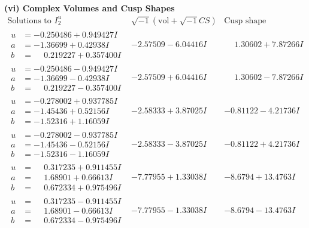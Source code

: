 \documentclass[1p]{elsarticle_modified}
\theoremstyle{definition}
\newcommand{\I}{\sqrt{-1}}
\begin{document}
\newpage\flushleft \textbf{(vi) Complex Volumes and Cusp Shapes}
$$\begin{array}{c|c|c}  
\text{Solutions to }I^u_{2}& \I (\text{vol} + \sqrt{-1}CS) & \text{Cusp shape}\\
 \hline 
\begin{aligned}
u &= -0.250486 + 0.949427 I \\
a &= -1.36699 + 0.42938 I \\
b &= \phantom{-}0.219227 + 0.357400 I\end{aligned}
 & -2.57509 - 6.04416 I & \phantom{-}1.30602 + 7.87266 I \\ \hline\begin{aligned}
u &= -0.250486 - 0.949427 I \\
a &= -1.36699 - 0.42938 I \\
b &= \phantom{-}0.219227 - 0.357400 I\end{aligned}
 & -2.57509 + 6.04416 I & \phantom{-}1.30602 - 7.87266 I \\ \hline\begin{aligned}
u &= -0.278002 + 0.937785 I \\
a &= -1.45436 + 0.52156 I \\
b &= -1.52316 + 1.16059 I\end{aligned}
 & -2.58333 + 3.87025 I & -0.81122 - 4.21736 I \\ \hline\begin{aligned}
u &= -0.278002 - 0.937785 I \\
a &= -1.45436 - 0.52156 I \\
b &= -1.52316 - 1.16059 I\end{aligned}
 & -2.58333 - 3.87025 I & -0.81122 + 4.21736 I \\ \hline\begin{aligned}
u &= \phantom{-}0.317235 + 0.911455 I \\
a &= \phantom{-}1.68901 + 0.66613 I \\
b &= \phantom{-}0.672334 + 0.975496 I\end{aligned}
 & -7.77955 + 1.33038 I & -8.6794 + 13.4763 I \\ \hline\begin{aligned}
u &= \phantom{-}0.317235 - 0.911455 I \\
a &= \phantom{-}1.68901 - 0.66613 I \\
b &= \phantom{-}0.672334 - 0.975496 I\end{aligned}
 & -7.77955 - 1.33038 I & -8.6794 - 13.4763 I \\ \hline\begin{aligned}

\end{aligned}
\end{array}$$
\end{document}
